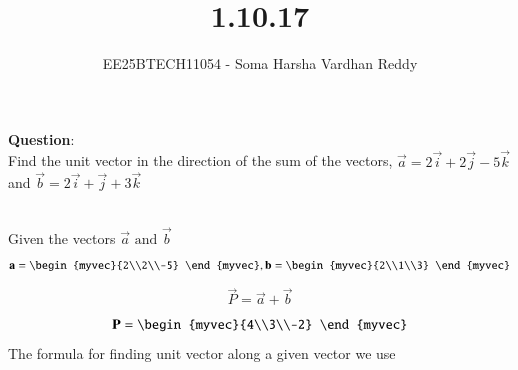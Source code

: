 \documentclass[journal]{IEEEtran}
\begin{document}
	
	
	\vspace{3cm}
	
	\title{1.10.17}
	\author{EE25BTECH11054 - Soma Harsha Vardhan Reddy }
	\maketitle
	{\let\newpage\relax\maketitle}
	
	\renewcommand{\thefigure}{\theenumi}
	\renewcommand{\thetable}{\theenumi}
	\setlength{\intextsep}{10pt} %
	
	
	\renewcommand{\thetable}{\theenumi}
	
	\textbf{Question}:\\
    Find the unit vector in the direction of the sum of the vectors, 
    $\vec{a} = 2\vec{i}+2\vec{j}-5\vec{k} $ and $\vec{b} = 2\vec{i}+\vec{j}+3\vec{k} $

    \solution \\
    Given the vectors $\vec{a}  \text{ and } \vec{b}$
    \begin{align}
		\vec{a} = \begin{myvec}{2\\2\\-5} \end{myvec} , \vec{b} = \begin{myvec}{2\\1\\3} \end{myvec}
	\end{align}
    \begin{align}
	\vec{P} =	\vec{a}+\vec{b}
	\end{align}
    \begin{align}
	\vec{P} =  \begin{myvec}{4\\3\\-2} \end{myvec} 
	\end{align}
    The formula for finding unit vector along a given vector we use
    
\end{document}
